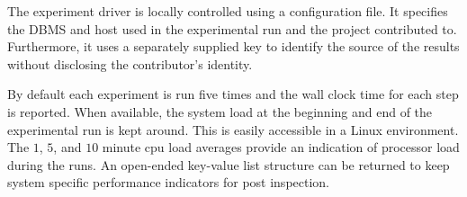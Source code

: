 \documentclass{cidr-2019}
\begin{document}
The experiment driver is locally controlled using a configuration
file. It specifies the DBMS and host used in the experimental run and
the project contributed to. Furthermore, it uses a separately supplied key
to identify the source of the results without
disclosing the contributor's identity.

By default each experiment is run five times and the wall clock time
for each step is reported. When available, the system load at the
beginning and end of the experimental run is kept around. This is
easily accessible in a Linux environment. The $1$, $5$, and $10$ minute
{\sc cpu} load averages provide an indication of processor load during
the runs. An open-ended key-value list structure can be returned to
keep system specific performance indicators for post inspection.







\end{document}
